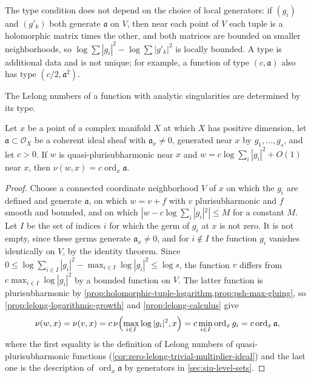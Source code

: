 The type condition does not depend on the choice of local generators: if $(g_i)$ and $(g'_k)$ both generate $\mathfrak a$ on $V$, then near each point of $V$ each tuple is a holomorphic matrix times the other, and both matrices are bounded on smaller neighborhoods, so $\log\sum|g_i|^2-\log\sum|g'_k|^2$ is locally bounded. A type is additional data and is not unique; for example, a function of type $(c,\mathfrak a)$ also has type $(c/2,\mathfrak a^2)$.

The Lelong numbers of a function with analytic singularities are determined by its type.

\begin{lemma}\label{lem:analytic-singularity-lelong-number}
Let $x$ be a point of a complex manifold $X$ at which $X$ has positive dimension, let $\mathfrak a\subset\mathcal O_X$ be a coherent ideal sheaf with $\mathfrak a_x\neq0$, generated near $x$ by $g_1,\ldots,g_s$, and let $c>0$. If $w$ is quasi-plurisubharmonic near $x$ and $w=c\log\sum_i|g_i|^2+O(1)$ near $x$, then $\nu(w,x)=c\operatorname{ord}_x\mathfrak a$.
\end{lemma}
\begin{proof}
Choose a connected coordinate neighborhood $V$ of $x$ on which the $g_i$ are defined and generate $\mathfrak a$, on which $w=v+f$ with $v$ plurisubharmonic and $f$ smooth and bounded, and on which $|w-c\log\sum_i|g_i|^2|\leq M$ for a constant $M$. Let $I$ be the set of indices $i$ for which the germ of $g_i$ at $x$ is not zero. It is not empty, since these germs generate $\mathfrak a_x\neq0$, and for $i\notin I$ the function $g_i$ vanishes identically on $V$, by the identity theorem. Since $0\leq\log\sum_{i\in I}|g_i|^2-\max_{i\in I}\log|g_i|^2\leq\log s$, the function $v$ differs from $c\max_{i\in I}\log|g_i|^2$ by a bounded function on $V$. The latter function is plurisubharmonic by \cref{prop:holomorphic-tuple-logarithm,prop:psh-max-gluing}, so \cref{prop:lelong-logarithmic-growth} and \cref{prop:lelong-calculus} give
\[
 \nu(w,x)=\nu(v,x)=c\,\nu\Bigl(\max_{i\in I}\log|g_i|^2,x\Bigr)=c\min_{i\in I}\operatorname{ord}_xg_i=c\operatorname{ord}_x\mathfrak a,
\]
where the first equality is the definition of Lelong numbers of quasi-plurisubharmonic functions (\cref{cor:zero-lelong-trivial-multiplier-ideal}) and the last one is the description of $\operatorname{ord}_x\mathfrak a$ by generators in \cref{sec:siu-level-sets}.
\end{proof}

